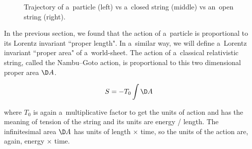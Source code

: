 \begin{figure}
\centering


\caption{Trajectory of a~particle (left) vs a~closed string (middle) vs an~open string (right).}
\label{fig:particle_vs_string}

\end{figure}

In the previous section, we found that the action of a~particle is proportional to its Lorentz invariant ``proper length". In a~similar way, we will define a~Lorentz invariant ``proper area" of a~world-sheet. The action of a~classical relativistic string, called the Nambu--Goto action, is proportional to this two dimensional proper area $\D A$.

\begin{equation}
    S = -T_0 \int \D A
\end{equation}

\noindent
where $T_0$ is again a~multiplicative factor to get the units of action and has the meaning of tension of the string and its units are energy / length. The infinitesimal area $\D A$ has units of length $\times$ time, so the units of the action are, again, energy $\times$ time.

